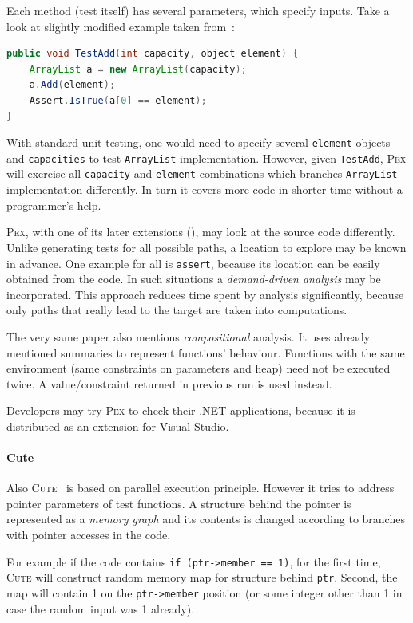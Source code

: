 \documentclass[11pt,a4paper]{article}
\begin{document}
Each method (test itself) has several parameters, which specify inputs. Take
a look at slightly modified example taken from~\cite{pex}:
\begin{lstlisting}[language=Java]
public void TestAdd(int capacity, object element) {
	ArrayList a = new ArrayList(capacity);
	a.Add(element);
	Assert.IsTrue(a[0] == element);
}
\end{lstlisting}
With standard unit testing, one would need to specify several \texttt{element}
objects and \texttt{capacities} to test \texttt{ArrayList} implementation.
However, given \texttt{TestAdd}, \textsc{Pex} will exercise all
\texttt{capacity} and \texttt{element} combinations which branches
\texttt{ArrayList} implementation differently. In turn it covers more code in
shorter time without a programmer's help.

\textsc{Pex}, with one of its later extensions (\cite{pex_ddse}), may look at
the source code differently. Unlike generating tests for all possible paths, a
location to explore may be known in advance. One example for all is
\texttt{assert}, because its location can be easily obtained from the code. In
such situations a \emph{demand-driven analysis} may be incorporated. This
approach reduces time spent by analysis significantly, because only paths
that really lead to the target are taken into computations.

The very same paper also mentions \emph{compositional} analysis. It uses
already mentioned summaries to represent functions' behaviour. Functions with
the same environment (same constraints on parameters and heap) need not be
executed twice. A value/constraint returned in previous run is used instead.

Developers may try \textsc{Pex} to check their .NET applications, because it
is distributed as an extension for Visual Studio.

\paragraph{Cute} Also \textsc{Cute}~\cite{cute} is based on parallel execution
principle. However it tries to address pointer parameters of test functions.
A structure behind the pointer is represented as a \emph{memory graph} and its
contents is changed according to branches with pointer accesses in the code.

For example if the code contains \texttt{if (ptr->member == 1)}, for the first
time, \textsc{Cute} will construct random memory map for structure behind
\texttt{ptr}. Second, the map will contain 1 on the \texttt{ptr->member}
position (or some integer other than 1 in case the random input was 1
already).
\end{document}
